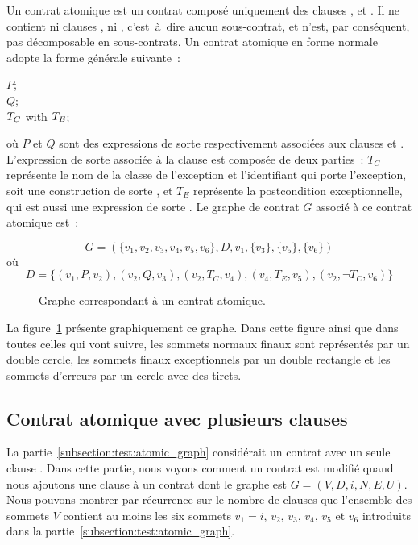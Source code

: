 Un {\strong contrat atomique} est un contrat composé uniquement des clauses
\arequires, \aensures et \athrowable. Il ne contient ni clauses \abehavior, ni
\adefault, c'est~à~dire aucun sous-contrat, et n'est, par conséquent, pas
décomposable en sous-contrats. Un contrat atomique en forme normale adopte la
forme générale suivante~:
%
\begin{pre}
\arequires  \(P\); \\
\aensures   \(Q\); \\
\athrowable \(T\sb{C}\) with \(T\sb{E}\);
\end{pre}
%
où $P$ et $Q$ sont des expressions de sorte  respectivement
associées aux clauses \arequires et \aensures. L'expression de sorte
 associée à la clause \athrowable est composée de
deux parties~: $T_C$ représente le nom de la classe de l'exception et
l'identifiant qui porte l'exception, soit une construction de sorte
, et $T_E$ représente la postcondition
exceptionnelle, qui est aussi une expression de sorte . Le
graphe de contrat $G$ associé à ce contrat atomique est~:


$$G = (
  \{v_1, v_2, v_3, v_4, v_5, v_6\},
  D,
  v_1,
  \{v_3\},
  \{v_5\},
  \{v_6\}
)$$
%
où
%
$$D = \{
  (v_1, P, v_2),
  (v_2, Q, v_3),
  (v_2, T_C, v_4),
  (v_4, T_E, v_5),
  (v_2, \neg T_C, v_6)
\}$$

\begin{figure}


\caption{\label{figure:test:atomic_graph} Graphe correspondant à un contrat
atomique.}

\end{figure}

La figure~\ref{figure:test:atomic_graph} présente graphiquement ce graphe. Dans
cette figure ainsi que dans toutes celles qui vont suivre, les sommets normaux
finaux sont représentés par un double cercle, les sommets finaux exceptionnels
par un double rectangle et les sommets d'erreurs par un cercle avec des tirets.

\subsection{Contrat atomique avec plusieurs clauses \athrowable}
\label{subsection:test:throwable_graph}

La partie~\ref{subsection:test:atomic_graph} considérait un contrat avec un
seule clause \athrowable. Dans cette partie, nous voyons comment un contrat est
modifié quand nous ajoutons une clause  à un
contrat dont le graphe est $G = (V, D, i, N, E, U)$. Nous pouvons montrer par
récurrence sur le nombre de clauses \athrowable que l'ensemble des sommets $V$
contient au moins les six sommets $v_1 = i$, $v_2$, $v_3$, $v_4$, $v_5$ et $v_6$
introduits dans la partie~\ref{subsection:test:atomic_graph}.

